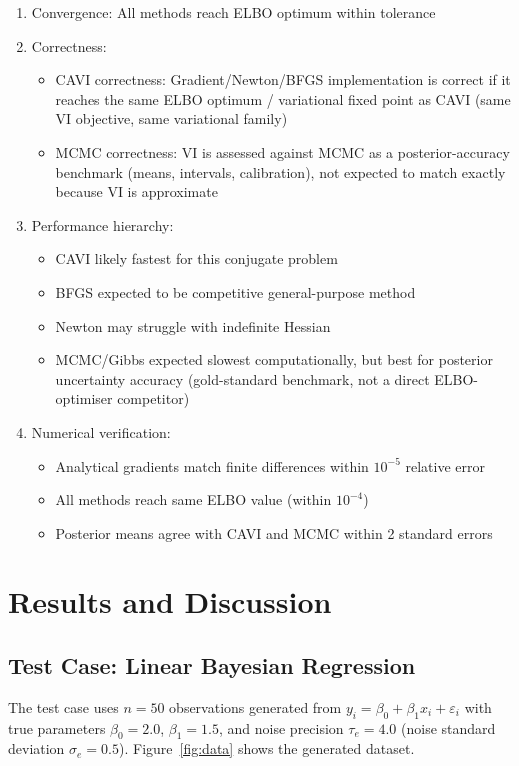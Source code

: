 \documentclass[11pt,a4paper]{article}
\begin{document}
\begin{enumerate}
\item Convergence: All methods reach ELBO optimum within tolerance
\item Correctness:
\begin{itemize}
\item CAVI correctness: Gradient/Newton/BFGS implementation is correct if it reaches the same ELBO optimum / variational fixed point as CAVI (same VI objective, same variational family)
\item MCMC correctness: VI is assessed against MCMC as a posterior-accuracy benchmark (means, intervals, calibration), not expected to match exactly because VI is approximate
\end{itemize}
\item Performance hierarchy:
\begin{itemize} 
\item CAVI likely fastest for this conjugate problem
\item BFGS expected to be competitive general-purpose method
\item Newton may struggle with indefinite Hessian
\item MCMC/Gibbs expected slowest computationally, but best for posterior uncertainty accuracy (gold-standard benchmark, not a direct ELBO-optimiser competitor)
\end{itemize}
\item Numerical verification:
\begin{itemize}
\item Analytical gradients match finite differences within $10^{-5}$ relative error
\item All methods reach same ELBO value (within $10^{-4}$)
\item Posterior means agree with CAVI and MCMC within 2 standard errors
\end{itemize}
\end{enumerate}
 

\section{Results and Discussion}
\label{sec:results}

\subsection{Test Case: Linear Bayesian Regression}

The test case uses $n=50$ observations generated from
$y_i = \beta_0 + \beta_1 x_i + \varepsilon_i$
with true parameters $\beta_0=2.0$, $\beta_1=1.5$, and noise precision $\tau_e=4.0$
(noise standard deviation $\sigma_e = 0.5$). Figure~\ref{fig:data} shows the generated dataset.
\end{document}
